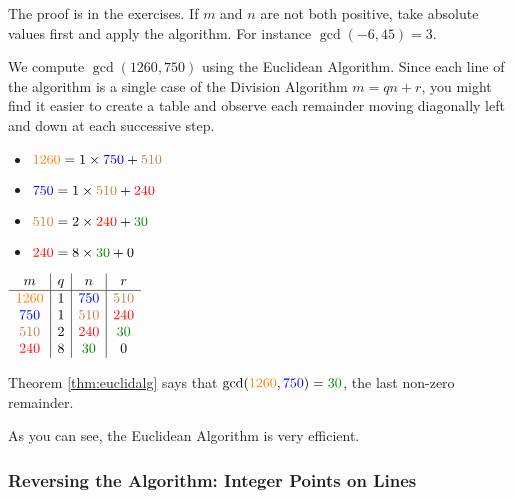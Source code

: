  The proof is in the exercises. If $m$ and $n$ are not both positive, take absolute values first and apply the algorithm. For instance $\gcd(-6,45)=3$.

\begin{example}{}{}
We compute $\gcd(1260,750)$ using the Euclidean Algorithm. Since each line of the algorithm is a single case of the Division Algorithm $m=qn+r$, you might find it easier to create a table and observe each remainder moving diagonally left and down at each successive step.

\begin{minipage}{0.5\textwidth}
\vspace*{10pt}
\begin{itemize}\setlength{\itemsep}{0pt}
  \item[]$\textcolor{orange}{1260}=1\times \textcolor{blue}{750}+\textcolor{brown}{510}$
  \item[]$\textcolor{blue}{750}=1\times \textcolor{brown}{510}+\textcolor{red}{240}$
  \item[]$\textcolor{brown}{510}=2\times \textcolor{red}{240}+\textcolor{Green}{30}$
  \item[]$\textcolor{red}{240}=8\times \textcolor{Green}{30}+0$
\end{itemize}
\end{minipage}
\begin{minipage}{0.5\textwidth}
\renewcommand{\arraystretch}{1.35}
$\begin{array}{c|c|c|c}
m&q&n&r\\\hline
\textcolor{orange}{1260}&1&\textcolor{blue}{750}&\textcolor{brown}{510}\\
\textcolor{blue}{750}&1&\textcolor{brown}{510}&\textcolor{red}{240}\\
\textcolor{brown}{510}&2&\textcolor{red}{240}&\textcolor{Green}{30}\\
\textcolor{red}{240}&8&\textcolor{Green}{30}&0
\end{array}$
\end{minipage}
Theorem \ref{thm:euclidalg} says that $\gcd(\textcolor{orange}{1260},\textcolor{blue}{750})=\textcolor{Green}{30}$, the last non-zero remainder.
\end{example}

 As you can see, the Euclidean Algorithm is very efficient.

\subsubsection*{Reversing the Algorithm: Integer Points on Lines}


